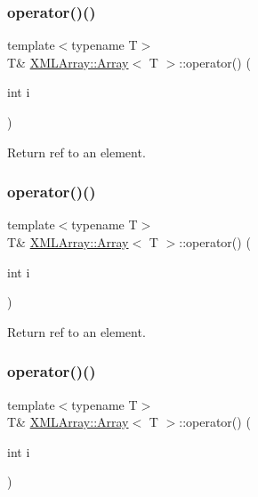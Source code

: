 \subsubsection{\texorpdfstring{operator()()}{operator()()}\hspace{0.1cm}{\footnotesize\ttfamily [1/6]}}
{\footnotesize\ttfamily template$<$typename T$>$ \\
T\& \mbox{\hyperlink{classXMLArray_1_1Array}{X\+M\+L\+Array\+::\+Array}}$<$ T $>$\+::operator() (\begin{DoxyParamCaption}\item[{int}]{i }\end{DoxyParamCaption})\hspace{0.3cm}{\ttfamily [inline]}}



Return ref to an element. 

\mbox{\label{classXMLArray_1_1Array_aaa5b7fcaa413265173fc75d3a5bbf837}} 
\subsubsection{\texorpdfstring{operator()()}{operator()()}\hspace{0.1cm}{\footnotesize\ttfamily [2/6]}}
{\footnotesize\ttfamily template$<$typename T$>$ \\
T\& \mbox{\hyperlink{classXMLArray_1_1Array}{X\+M\+L\+Array\+::\+Array}}$<$ T $>$\+::operator() (\begin{DoxyParamCaption}\item[{int}]{i }\end{DoxyParamCaption})\hspace{0.3cm}{\ttfamily [inline]}}



Return ref to an element. 

\mbox{\label{classXMLArray_1_1Array_aaa5b7fcaa413265173fc75d3a5bbf837}} 
\subsubsection{\texorpdfstring{operator()()}{operator()()}\hspace{0.1cm}{\footnotesize\ttfamily [3/6]}}
{\footnotesize\ttfamily template$<$typename T$>$ \\
T\& \mbox{\hyperlink{classXMLArray_1_1Array}{X\+M\+L\+Array\+::\+Array}}$<$ T $>$\+::operator() (\begin{DoxyParamCaption}\item[{int}]{i }\end{DoxyParamCaption})\hspace{0.3cm}{\ttfamily [inline]}}



